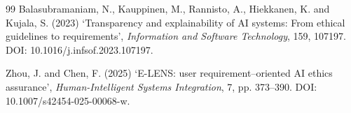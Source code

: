\documentclass[11pt,a4paper]{article}
\begin{document}
\begin{thebibliography}{99}
Balasubramaniam, N., Kauppinen, M., Rannisto, A., Hiekkanen, K. and Kujala, S. (2023) `Transparency and explainability of AI systems: From ethical guidelines to requirements', \textit{Information and Software Technology}, 159, 107197. DOI: 10.1016/j.infsof.2023.107197.

Zhou, J. and Chen, F. (2025) `E-LENS: user requirement--oriented AI ethics assurance', \textit{Human-Intelligent Systems Integration}, 7, pp. 373--390. DOI: 10.1007/s42454-025-00068-w.

\end{thebibliography}
\end{document}
